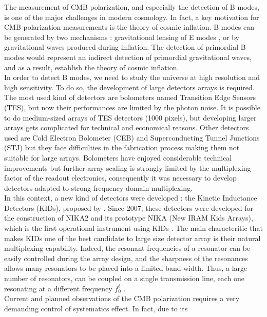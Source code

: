 \documentclass[twocolumn, traditabstract]{aa}
\begin{document}
The measurement of CMB polarization, and especially the detection of B modes, is
one of the major challenges in modern cosmology. In fact, a key motivation for
CMB polarization measurements is the theory of cosmic inflation. B modes can be
generated by two mechanisms : gravitational lensing of E modes
\citep{2013PhRvL.111n1301H}, or by gravitational waves produced during
inflation. The detection of primordial B modes would represent an indirect
detection of primordial gravitational waves, and as a result, establish the
theory of cosmic inflation.\\ In order to detect B modes, we need to study the
universe at high resolution and high sensitivity. To do so, the development of
large detectors arrays is required.  The most used kind of detectors are
bolometers named Transition Edge Sensors (TES), but now their performances are
limited by the photon noise. It is possible to do medium-sized arrays of TES
detectors (1000 pixels), but developing larger arrays gets complicated for
technical and economical reasons. Other detectors used are Cold Electron
Bolometer (CEB) \citep{2007stt..conf...93K} and Superconducting Tunnel Junctions
(STJ) but they face difficulties in the fabrication process making them not
suitable for large arrays. Bolometers have enjoyed considerable technical
improvements but further array scaling is strongly limited by the multiplexing
factor of the readout electronics, consequently it was necessary to develop
detectors adapted to strong frequency domain multiplexing.\\ In this context, a
new kind of detectors were developed : the Kinetic Inductance Detectors (KIDs),
proposed by \citet{2003Natur.425..817D}. Since 2007, these detectors were
developed for the construction of NIKA2 and its prototype NIKA (New IRAM Kids
Arrays), which is the first operational instrument using KIDs
\citep{2010A&A...521A..29M,2016JLTP..184..816C}. The main characteritic that
makes KIDs one of the best candidate to large size detector array is their
natural multiplexing capability. Indeed, the resonant frequencies of a resonator
can be easily controlled during the array design, and the sharpness of the
resonances allows many resonators to be placed into a limited band-width. Thus,
a large number of resonators, can be coupled on a single transmission line, each
one resonating at a different frequency $f_{0}^{i}$ \citep{2010A&A...521A..29M,
  Calvo2008}.\\ Current and planned observations of the CMB polarization
requires a very demanding control of systematics effect. In fact, due to its
\end{document}
